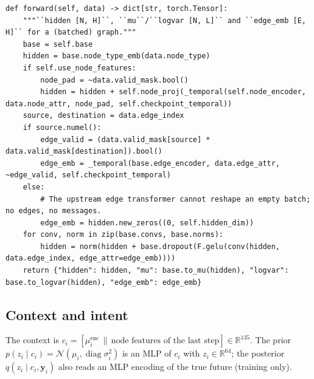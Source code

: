 \documentclass[10pt]{article}
\begin{document}
\par\smallskip{}\par\nopagebreak
\begin{lstlisting}[aboveskip=2pt]
def forward(self, data) -> dict[str, torch.Tensor]:
    """``hidden [N, H]``, ``mu``/``logvar [N, L]`` and ``edge_emb [E, H]`` for a (batched) graph."""
    base = self.base
    hidden = base.node_type_emb(data.node_type)
    if self.use_node_features:
        node_pad = ~data.valid_mask.bool()
        hidden = hidden + self.node_proj(_temporal(self.node_encoder, data.node_attr, node_pad, self.checkpoint_temporal))
    source, destination = data.edge_index
    if source.numel():
        edge_valid = (data.valid_mask[source] * data.valid_mask[destination]).bool()
        edge_emb = _temporal(base.edge_encoder, data.edge_attr, ~edge_valid, self.checkpoint_temporal)
    else:
        # The upstream edge transformer cannot reshape an empty batch; no edges, no messages.
        edge_emb = hidden.new_zeros((0, self.hidden_dim))
    for conv, norm in zip(base.convs, base.norms):
        hidden = norm(hidden + base.dropout(F.gelu(conv(hidden, data.edge_index, edge_attr=edge_emb))))
    return {"hidden": hidden, "mu": base.to_mu(hidden), "logvar": base.to_logvar(hidden), "edge_emb": edge_emb}

\end{lstlisting}

\subsection{Context and intent}
The context is $c_i=[\mu^{\text{enc}}_i \,\|\, \text{node features of the last step}]\in\mathbb R^{135}$. The prior
$p(z_i\mid c_i)=\mathcal N(\mu_i,\operatorname{diag}\sigma_i^2)$ is an MLP of $c_i$ with $z_i\in\mathbb R^{64}$; the posterior
$q(z_i\mid c_i,\mathbf y_i)$ also reads an MLP encoding of the true future (training only).
\end{document}
